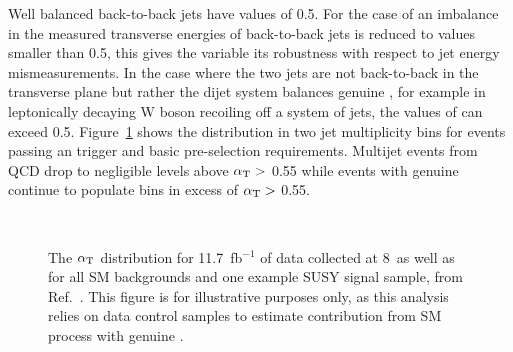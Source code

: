 Well balanced back-to-back jets have \alphat values of 0.5. 
For the case of an imbalance in the measured transverse energies 
of back-to-back jets \alphat is reduced to values smaller than 0.5, 
this gives the variable its robustness with respect to jet energy 
mismeasurements. In the case where the two jets are not back-to-back 
in the transverse plane but rather the dijet system balances genuine 
\met, for example in leptonically decaying W boson recoiling off a 
system of jets, the values of \alphat can exceed 0.5.
Figure~\ref{fig:alphat_dist} shows the \alphat 
distribution in two jet multiplicity bins for events passing 
an \scalht trigger and basic pre-selection requirements. Multijet 
events from QCD drop to negligible levels above $\alpha_{\text{T}}>$ 0.55
while events with genuine \met continue to populate bins in excess
of  $\alpha_{\text{T}}>$ 0.55.

\begin{figure}[h!t]
  \begin{center}
     \\
      \caption{\label{fig:alphat-2011} The $\alpha_{\text{T}}$ distribution for 11.7~fb$^{-1}$ 
            of data collected at {8}~\tev as well as for all SM
            backgrounds and one example SUSY signal sample, from Ref.~\cite{RA1Paper2012}.
            This figure is for illustrative purposes only, as this analysis relies
            on data control samples to estimate contribution from SM process 
            with genuine \met.}
    \label{fig:alphat_dist}
  \end{center}
\end{figure}

